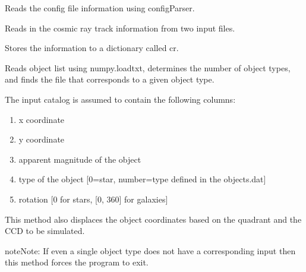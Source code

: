 \documentclass[a4paper,11pt,english]{sphinxmanual}
\begin{document}
\begin{fulllineitems}
\begin{fulllineitems}
\label{simulator:simulator.simulator.VISsimulator.readConfigs}
Reads the config file information using configParser.

\end{fulllineitems}


\begin{fulllineitems}
\label{simulator:simulator.simulator.VISsimulator.readCosmicRayInformation}
Reads in the cosmic ray track information from two input files.

Stores the information to a dictionary called cr.

\end{fulllineitems}


\begin{fulllineitems}
\label{simulator:simulator.simulator.VISsimulator.readObjectlist}
Reads object list using numpy.loadtxt, determines the number of object types,
and finds the file that corresponds to a given object type.

The input catalog is assumed to contain the following columns:
\begin{enumerate}
\item {} 
x coordinate

\item {} 
y coordinate

\item {} 
apparent magnitude of the object

\item {} 
type of the object {[}0=star, number=type defined in the objects.dat{]}

\item {} 
rotation {[}0 for stars, {[}0, 360{]} for galaxies{]}

\end{enumerate}

This method also displaces the object coordinates based on the quadrant and the
CCD to be simulated.

\begin{notice}{note}{Note:}
If even a single object type does not have a corresponding input then this method
forces the program to exit.
\end{notice}


\end{fulllineitems}
\end{fulllineitems}
\end{document}
